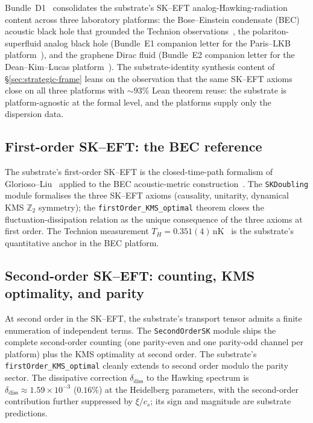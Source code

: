 \documentclass[aps,prd,reprint,nofootinbib,superscriptaddress]{revtex4-2}
\begin{document}
Bundle~D1~\cite{Roehm2026D1} consolidates the substrate's SK--EFT
analog-Hawking-radiation content across three laboratory platforms:
the Bose--Einstein condensate (BEC) acoustic black hole that grounded
the Technion observations~\cite{Steinhauer2016,deNova2019,
Kolobov2021,Wang2017}, the polariton-superfluid analog black hole
(Bundle~E1 companion letter for the Paris--LKB platform~\cite{Roehm2026E1}),
and the graphene Dirac fluid (Bundle~E2 companion letter for the
Dean--Kim--Lucas platform~\cite{Roehm2026E2}). The substrate-identity
synthesis content of \S\ref{sec:strategic-frame} leans on the
observation that the same SK--EFT axioms close on all three platforms
with $\sim 93\%$ Lean theorem reuse: the substrate is platform-agnostic
at the formal level, and the platforms supply only the dispersion
data.

\subsection{First-order SK--EFT: the BEC reference}

The substrate's first-order SK--EFT is the closed-time-path
formalism of Glorioso--Liu~\cite{GloriosoLiu2018} applied to the
BEC acoustic-metric construction~\cite{Steinhauer2016}. The
\texttt{SKDoubling} module formalises the three SK--EFT axioms
(causality, unitarity, dynamical KMS $\mathbb{Z}_2$ symmetry); the
\texttt{firstOrder\_KMS\_optimal} theorem closes the
fluctuation-dissipation relation as the unique consequence of the
three axioms at first order. The Technion measurement
$T_H = 0.351(4)\,\mathrm{nK}$~\cite{deNova2019} is the substrate's
quantitative anchor in the BEC platform.

\subsection{Second-order SK--EFT: counting, KMS optimality, and parity}

At second order in the SK--EFT, the substrate's transport tensor
admits a finite enumeration of independent terms. The
\texttt{SecondOrderSK} module ships the complete second-order
counting (one parity-even and one parity-odd channel per platform)
plus the KMS optimality at second order. The substrate's
\texttt{firstOrder\_KMS\_optimal} cleanly extends to second order
modulo the parity sector. The dissipative correction $\delta_{\mathrm{diss}}$
to the Hawking spectrum is $\delta_{\mathrm{diss}} \approx 1.59\times10^{-3}$
($0.16\%$) at the Heidelberg parameters, with the second-order
contribution further suppressed by $\xi/c_s$; its sign and magnitude
are substrate predictions.
\end{document}
